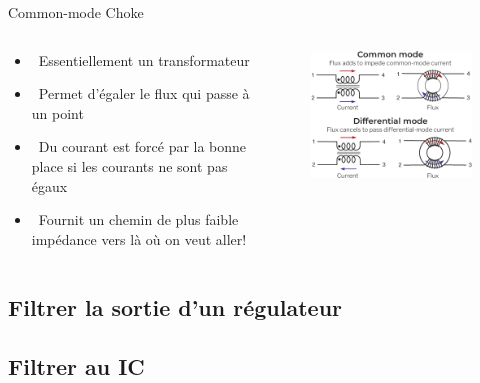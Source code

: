 \begin{frame}{Common-mode Choke}
    \begin{columns}
        \begin{column}{0.45\textwidth}
            \begin{itemize}
                \item[] \textcolor{UDSgreenFierte}{\faUnlink}
                    ~Essentiellement un transformateur
                \item[] \textcolor{UDSgreenFierte}{\faSync}
                    ~Permet d'égaler le flux qui passe à un point
                \item[] \textcolor{UDSgreenFierte}{\faExchange*}
                    ~Du courant est forcé par la bonne place si les courants ne sont pas égaux
                \bigskip
                \item[] \textcolor{UDSgreenFierte}{\faLongArrowAltRight}
                    ~Fournit un chemin de plus faible impédance vers là où on veut aller!
            \end{itemize}
        \end{column}
        \begin{column}{0.55\textwidth}
            \begin{figure}
                \includegraphics[width=\textwidth, height=0.75\textheight, keepaspectratio]{pictures/common-mode-choke.png}
            \end{figure}
        \end{column}
    \end{columns}
\end{frame}

\subsection{Filtrer la sortie d'un régulateur}
\subsection{Filtrer au IC}
